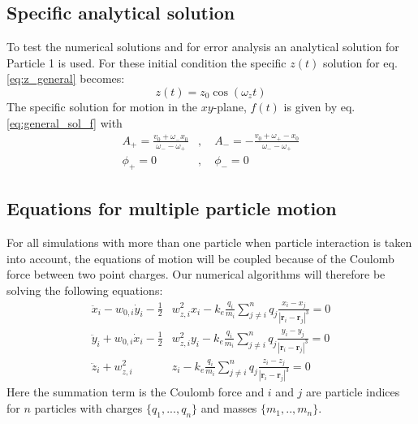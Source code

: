 \documentclass[english,notitlepage,reprint,nofootinbib]{revtex4-1}  %
\begin{document}
\subsection*{Specific analytical solution}
To test the numerical solutions and for error analysis an analytical solution for
Particle 1 is used. For these initial condition the specific $z(t)$ solution for
eq. \ref{eq:z_general} becomes:
\begin{equation*}
    z(t) = z_0 \cos(\omega_z t)
\end{equation*}
The specific solution for motion in the $xy$-plane, $f(t)$ is given by eq. \ref{eq:general_sol_f}
with
\begin{align*}
    A_+ = \frac{v_0 + \omega_- x_0}{\omega_- - \omega_+} & , \quad A_- = -\frac{v_0 + \omega_+- x_0}{\omega_- - \omega_+} \\
    \phi_+ = 0                                           & , \quad \phi_- = 0
\end{align*}


\subsection*{Equations for multiple particle motion}
For all simulations with more than one particle when particle interaction is taken into account,
the equations of motion will be coupled because of the Coulomb force between two point charges.
Our numerical algorithms will therefore be solving the following equations:
\begin{align}
    \ddot{x}_i - w_{0,i} \dot{y}_i - \frac{1}{2} & w_{z,i}^2 x_i - k_e \frac{q_i}{m_i} \sum_{j\neq i}^{n} q_j \frac{x_i - x_j}{|\textbf{r}_i - \textbf{r}_j|^3} = 0 \label{eq:a_x_coupled} \\
    \ddot{y}_i + w_{0,i} \dot{x}_i - \frac{1}{2} & w_{z,i}^2 y_i - k_e \frac{q_i}{m_i} \sum_{j\neq i}^{n} q_j \frac{y_i - y_j}{|\textbf{r}_i - \textbf{r}_j|^3} = 0 \label{eq:a_y_coupled} \\
    \ddot{z}_i + w_{z,i}^2                       & z_i - k_e \frac{q_i}{m_i} \sum_{j\neq i}^{n} q_j \frac{z_i - z_j}{|\textbf{r}_i - \textbf{r}_j|^3} = 0 \label{eq:a_z_coupled}
\end{align}
Here the summation term is the Coulomb force and $i$ and $j$ are particle indices for $n$ particles
with charges $\{q_1,...,q_n\}$ and masses $\{m_1,..,m_n\}$.
\end{document}
